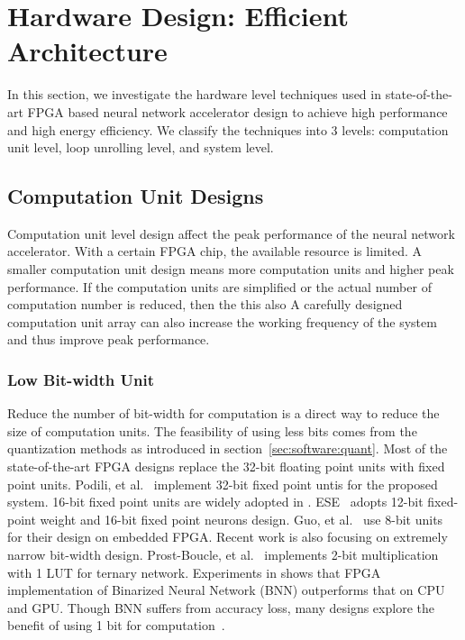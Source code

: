 \section{Hardware Design: Efficient Architecture}\label{sec:hardware}

In this section, we investigate the hardware level techniques used in state-of-the-art FPGA based neural network accelerator design to achieve high performance and high energy efficiency. We classify the techniques into 3 levels: computation unit level, loop unrolling level, and system level.

\subsection{Computation Unit Designs}\label{sec:hardware:cu}

Computation unit level design affect the peak performance of the neural network accelerator. With a certain FPGA chip, the available resource is limited. A smaller computation unit design means more computation units and higher peak performance. If the computation units are simplified or the actual number of computation number is reduced, then the  this also A carefully designed computation unit array can also increase the working frequency of the system and thus improve peak performance.

\subsubsection{Low Bit-width Unit}\label{sec:hardware:cu:lbu}
Reduce the number of bit-width for computation is a direct way to reduce the size of computation units. The feasibility of using less bits comes from the quantization methods as introduced in section~\ref{sec:software:quant}. Most of the state-of-the-art FPGA designs replace the 32-bit floating point units with fixed point units. Podili, et al.~\cite{podili2017fast} implement 32-bit fixed point untis for the proposed system. 16-bit fixed point units are widely adopted in \cite{qiu2016going, li2016high, xiao2017exploring, guan2017fp, zhang2016caffeine}. ESE~\cite{han2017ese} adopts 12-bit fixed-point weight and 16-bit fixed point neurons design. Guo, et al.~\cite{guo2017angel} use 8-bit units for their design on embedded FPGA. Recent work is also focusing on extremely narrow bit-width design. Prost-Boucle, et al.~\cite{prost2017scalable} implements 2-bit multiplication with 1 LUT for ternary network. Experiments in \cite{nurvitadhi2016accelerating} shows that FPGA implementation of Binarized Neural Network (BNN) outperforms that on CPU and GPU. Though BNN suffers from accuracy loss, many designs explore the benefit of using 1 bit for computation~\cite{li20177, nakahara2017batch, zhao2017accelerating, umuroglu2017finn, nakahara2017fully, jiao2017accelerating, moss2017high}.

